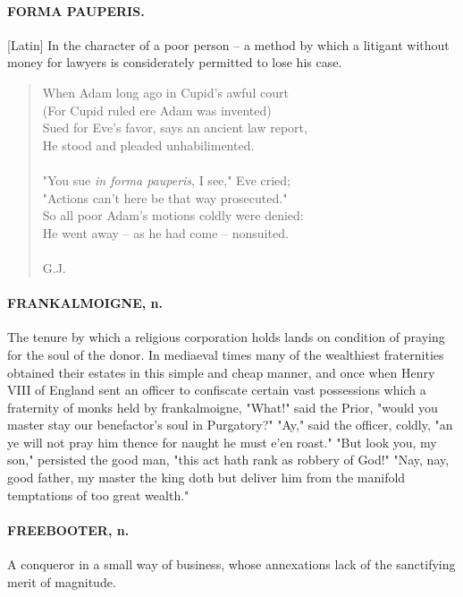 \documentclass[11pt]{article}
\begin{document}
\paragraph{FORMA PAUPERIS.}  [Latin]  In the character of a poor person -- a
method by which a litigant without money for lawyers is considerately
permitted to lose his case.

\begin{quote}   When Adam long ago in Cupid's awful court \\
      (For Cupid ruled ere Adam was invented) \\
  Sued for Eve's favor, says an ancient law report, \\
      He stood and pleaded unhabilimented. \\
 \\
  "You sue {\em in forma pauperis}, I see," Eve cried; \\
      "Actions can't here be that way prosecuted." \\
  So all poor Adam's motions coldly were denied: \\
      He went away -- as he had come -- nonsuited. \\
 \\
G.J. \end{quote}


\paragraph{FRANKALMOIGNE, n.}  The tenure by which a religious corporation holds
lands on condition of praying for the soul of the donor.  In mediaeval
times many of the wealthiest fraternities obtained their estates in
this simple and cheap manner, and once when Henry VIII of England sent
an officer to confiscate certain vast possessions which a fraternity
of monks held by frankalmoigne, "What!" said the Prior, "would you
master stay our benefactor's soul in Purgatory?"  "Ay," said the
officer, coldly, "an ye will not pray him thence for naught he must
e'en roast."  "But look you, my son," persisted the good man, "this
act hath rank as robbery of God!"  "Nay, nay, good father, my master
the king doth but deliver him from the manifold temptations of too
great wealth."

\paragraph{FREEBOOTER, n.}  A conqueror in a small way of business, whose
annexations lack of the sanctifying merit of magnitude.
\end{document}
